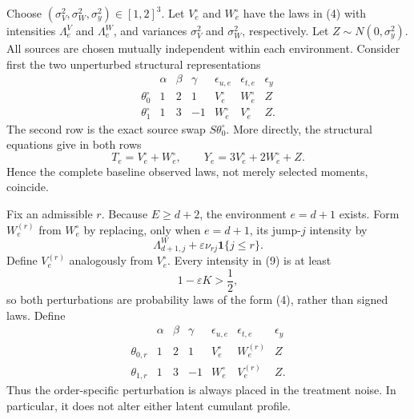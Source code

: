Choose \((\sigma_V^2,\sigma_W^2,\sigma_y^2)\in[1,2]^3\).  Let \(V_e^\circ\) and \(W_e^\circ\) have the laws in (4) with intensities \(\Lambda^V_e\) and \(\Lambda^W_e\), and variances \(\sigma_V^2\) and \(\sigma_W^2\), respectively.  Let \(Z\sim N(0,\sigma_y^2)\).  All sources are chosen mutually independent within each environment.  Consider first the two unperturbed structural representations
\[
 \begin{array}{c|ccc|ccc}
 &\alpha&\beta&\gamma&\epsilon_{u,e}&\epsilon_{t,e}&\epsilon_y\\ \hline
 \theta_0^\circ&1&2&1&V_e^\circ&W_e^\circ&Z\\
 \theta_1^\circ&1&3&-1&W_e^\circ&V_e^\circ&Z.
 \end{array}
 \tag{7}
\]
The second row is the exact source swap \(S\theta_0^\circ\).  More directly, the structural equations give in both rows
\[
 T_e=V_e^\circ+W_e^\circ,
 \qquad
 Y_e=3V_e^\circ+2W_e^\circ+Z.
 \tag{8}
\]
Hence the complete baseline observed laws, not merely selected moments, coincide.

Fix an admissible \(r\).  Because \(E\geq d+2\), the environment \(e=d+1\) exists.  Form \(W_e^{(r)}\) from \(W_e^\circ\) by replacing, only when \(e=d+1\), its jump-\(j\) intensity by
\[
 \Lambda^W_{d+1,j}+\varepsilon\nu_{rj}\mathbf 1\{j\leq r\}.
 \tag{9}
\]
Define \(V_e^{(r)}\) analogously from \(V_e^\circ\).  Every intensity in (9) is at least
\[
 1-\varepsilon K>\frac12,
 \tag{10}
\]
so both perturbations are probability laws of the form (4), rather than signed laws.  Define
\[
 \begin{array}{c|ccc|ccc}
 &\alpha&\beta&\gamma&\epsilon_{u,e}&\epsilon_{t,e}&\epsilon_y\\ \hline
 \theta_{0,r}&1&2&1&V_e^\circ&W_e^{(r)}&Z\\
 \theta_{1,r}&1&3&-1&W_e^\circ&V_e^{(r)}&Z.
 \end{array}
 \tag{11}
\]
Thus the order-specific perturbation is always placed in the treatment noise.  In particular, it does not alter either latent cumulant profile.

